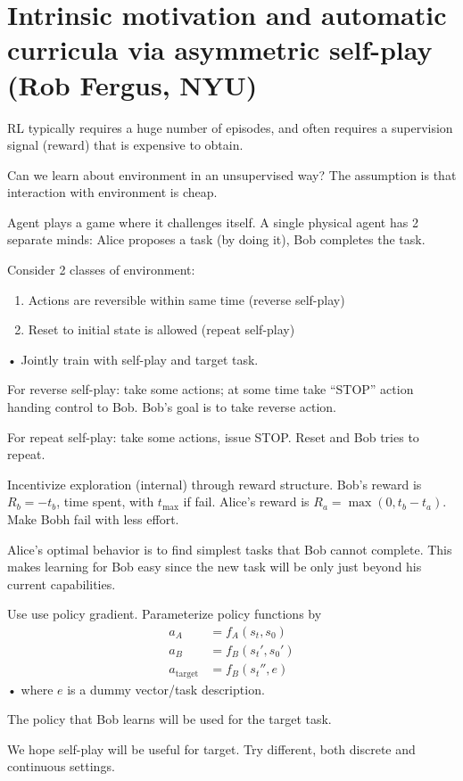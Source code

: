 \section{Intrinsic motivation and automatic curricula via asymmetric self-play (Rob Fergus, NYU)}

RL typically requires a huge number of episodes, and often requires a supervision signal (reward) that is expensive to obtain.

Can we learn about environment in an unsupervised way? The assumption is that interaction with environment is cheap.

Agent plays a game where it challenges itself. A single physical agent has 2 separate minds: Alice proposes a task (by doing it), Bob completes the task. 

Consider 2 classes of environment:
\begin{enumerate}
\item
Actions are reversible within same time (reverse self-play)
\item
Reset to initial state is allowed (repeat self-play)
\end{enumerate}•
Jointly train with self-play and target task.

For reverse self-play: take some actions; at some time take ``STOP'' action handing control to Bob. Bob's goal is to take reverse action.

For repeat self-play: take some actions, issue STOP. Reset and Bob tries to repeat.

Incentivize exploration (internal) through reward structure. Bob's reward is $R_b=-t_b$, time spent, with $t_{\max}$ if fail. Alice's reward is $R_a=\max(0,t_b-t_a)$. Make Bobh fail with less effort.

Alice's optimal behavior is to find simplest tasks that Bob cannot complete. This makes learning for Bob easy since the new task will be only just beyond his current capabilities. 

Use use policy gradient. Parameterize policy functions by
\begin{align}
a_{A}&=f_A(s_t,s_0)\\
a_B&= f_B(s_t', s_0')\\
a_{\text{target}} &= f_B(s_t'',e)
\end{align}•
where $e$ is a dummy vector/task description.

The policy that Bob learns will be used for the target task.

We hope self-play will be useful for target. Try different, both discrete and continuous settings. %

